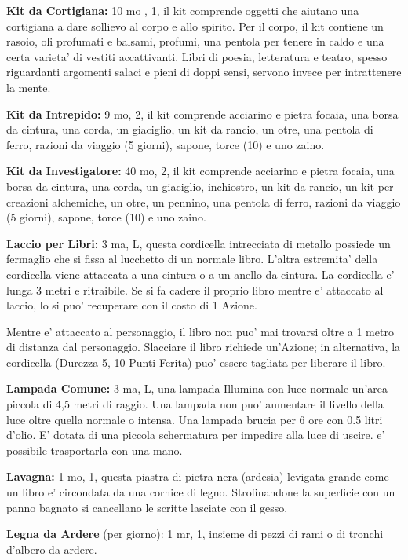 \documentclass[a4paper,11pt,twoside,openany]{book}
\begin{document}
{		\textbf{Kit da Cortigiana:} 10 mo , 1, il kit comprende oggetti che aiutano una cortigiana a dare sollievo al corpo e allo spirito. Per il corpo, il kit contiene un rasoio, oli profumati e balsami, profumi, una pentola per tenere in caldo e una certa varieta' di vestiti accattivanti. Libri di poesia, letteratura e teatro, spesso riguardanti argomenti salaci e pieni di doppi sensi, servono invece per intrattenere la mente.
		
		\textbf{Kit da Intrepido:} 9 mo, 2, il kit comprende acciarino e pietra focaia, una borsa da cin­tura, una corda, un giaciglio, un kit da rancio, un otre, una pentola di ferro, razioni da viaggio (5 giorni), sapone, torce (10) e uno zaino.
		
		\textbf{Kit da Investigatore:} 40 mo, 2, il kit comprende acciarino e pietra focaia, una borsa da cin­tura, una corda, un giaciglio, inchiostro, un kit da rancio, un kit per creazioni alchemiche, un otre, un pennino, una pentola di ferro, razioni da viaggio (5 giorni), sapone, torce (10) e uno zaino.
		
		\textbf{Laccio per Libri:} 3 ma, L, questa cordicella intrecciata di metallo possiede un fermaglio che si fissa al lucchetto di un normale libro. L'altra estremita' della cordicella viene attaccata a una cintura o a un anello da cintura. La cordicella e' lunga 3 metri e ritraibile. Se si fa cadere il proprio libro mentre e' attaccato al laccio, lo si puo' recuperare con il costo di 1 Azione.
		
		Mentre e' attaccato al personaggio, il libro non puo' mai trovarsi oltre a 1 metro di distanza dal personaggio. Slacciare il libro richiede un'Azione; in alternativa, la cordicella (Durezza 5, 10 Punti Ferita) puo' essere tagliata per liberare il libro.
		
		\textbf{Lampada Comune:} 3 ma, L, una lampada Illumina con luce normale un'area piccola di 4,5 metri di raggio. Una lampada non puo' aumentare il livello della luce oltre quella normale o intensa. Una lampada brucia per 6 ore con 0.5 litri d'olio. E' dotata di una piccola schermatura per impedire alla luce di uscire. e' possibile trasportarla con una mano.
		
		\textbf{Lavagna:} 1 mo, 1, questa piastra di pietra nera (ardesia) levigata grande come un libro e' circondata da una cornice di legno. Strofinandone la superficie con un panno bagnato si cancellano le scritte lasciate con il gesso.
		
		\textbf{Legna da Ardere} (per giorno): 1 mr, 1, insieme di pezzi di rami o di tronchi d'albero da ardere.
		
}
\end{document}

